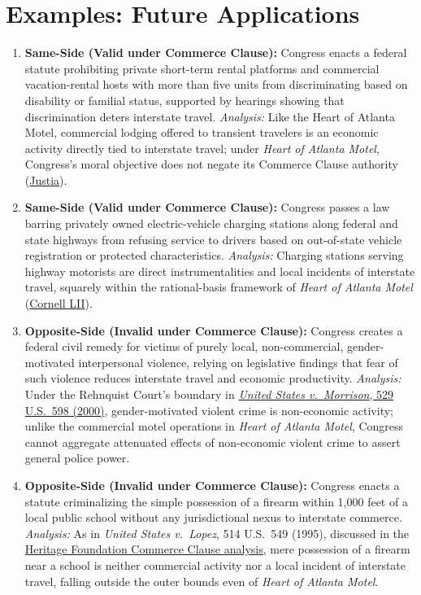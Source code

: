 \documentclass[12pt]{article}
\begin{document}
\section{Examples: Future Applications}
\begin{enumerate}
\item \textbf{Same-Side (Valid under Commerce Clause):} Congress enacts a federal statute prohibiting private short-term rental platforms and commercial vacation-rental hosts with more than five units from discriminating based on disability or familial status, supported by hearings showing that discrimination deters interstate travel. \textit{Analysis:} Like the Heart of Atlanta Motel, commercial lodging offered to transient travelers is an economic activity directly tied to interstate travel; under \textit{Heart of Atlanta Motel}, Congress's moral objective does not negate its Commerce Clause authority (\href{https://supreme.justia.com/cases/federal/us/379/241/}{Justia}).
\item \textbf{Same-Side (Valid under Commerce Clause):} Congress passes a law barring privately owned electric-vehicle charging stations along federal and state highways from refusing service to drivers based on out-of-state vehicle registration or protected characteristics. \textit{Analysis:} Charging stations serving highway motorists are direct instrumentalities and local incidents of interstate travel, squarely within the rational-basis framework of \textit{Heart of Atlanta Motel} (\href{https://www.law.cornell.edu/supremecourt/text/379/241}{Cornell LII}).
\item \textbf{Opposite-Side (Invalid under Commerce Clause):} Congress creates a federal civil remedy for victims of purely local, non-commercial, gender-motivated interpersonal violence, relying on legislative findings that fear of such violence reduces interstate travel and economic productivity. \textit{Analysis:} Under the Rehnquist Court's boundary in \href{https://supreme.justia.com/cases/federal/us/529/598/}{\textit{United States v.\ Morrison}, 529 U.S.\ 598 (2000)}, gender-motivated violent crime is non-economic activity; unlike the commercial motel operations in \textit{Heart of Atlanta Motel}, Congress cannot aggregate attenuated effects of non-economic violent crime to assert general police power.
\item \textbf{Opposite-Side (Invalid under Commerce Clause):} Congress enacts a statute criminalizing the simple possession of a firearm within 1,000 feet of a local public school without any jurisdictional nexus to interstate commerce. \textit{Analysis:} As in \textit{United States v.\ Lopez}, 514 U.S.\ 549 (1995), discussed in the \href{https://constitution.heritage.org/essays/a1-s8-c3-b/}{Heritage Foundation Commerce Clause analysis}, mere possession of a firearm near a school is neither commercial activity nor a local incident of interstate travel, falling outside the outer bounds even of \textit{Heart of Atlanta Motel}.

\end{enumerate}
\end{document}
